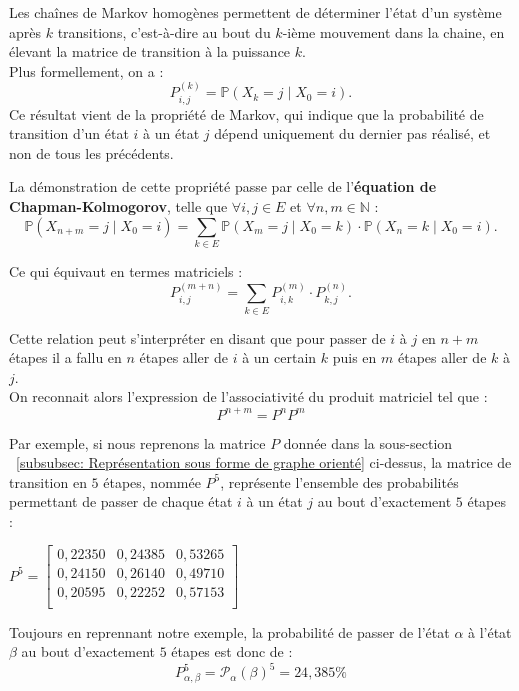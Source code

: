 \documentclass{article}
\begin{document}
Les chaînes de Markov homogènes permettent de déterminer l'état d'un système après $k$ transitions, c'est-à-dire au bout du $k$-ième mouvement dans la chaine, en élevant la matrice de transition à la puissance $k$. \\
Plus formellement, on a :
\[
P_{i,j}^{(k)} = \mathbb{P}(X_k = j \mid X_0 = i).
\]
Ce résultat vient de la propriété de Markov, qui indique que la probabilité de transition d'un état $i$ à un état $j$ dépend uniquement du dernier pas réalisé, et non de tous les précédents.

\begin{tcolorbox}[colback=white,colframe=green!80!black,title=Démonstration]
La démonstration de cette propriété passe par celle de l'\textbf{équation de Chapman-Kolmogorov}, telle que $\forall i,j \in E$ et $\forall n,m \in \mathbb{N}$ :
\[
\mathbb{P}(X_{n+m} = j \mid X_0 = i) = \sum_{k \in E} \mathbb{P}(X_{m} = j \mid X_0 = k) \cdot \mathbb{P}(X_n = k \mid X_0 = i).
\]

Ce qui équivaut en termes matriciels :
\[
P_{i,j}^{(m+n)} = \sum_{k \in E} P_{i,k}^{(m)} \cdot P_{k,j}^{(n)}.
\]

Cette relation peut s'interpréter en disant que pour passer de $i$ à $j$ en $n+m$ étapes il a fallu en $n$ étapes aller de $i$ à un certain $k$ puis en $m$ étapes aller de $k$ à $j$. \\

On reconnait alors l'expression de l'associativité du produit matriciel tel que :
\[
P^{n+m} = P^{n}P^{m}
\]

\end{tcolorbox}

Par exemple, si nous reprenons la matrice $P$ donnée dans la sous-section ~\ref{subsubsec: Représentation sous forme de graphe orienté} ci-dessus, la matrice de transition en $5$ étapes, nommée $P^{5}$, représente l'ensemble des probabilités permettant de passer de chaque état $i$ à un état $j$ au bout d'exactement $5$ étapes :
\begin{center}
$
P^{5} = \begin{bmatrix}
0,22350 & 0,24385 & 0,53265 \\
0,24150 & 0,26140 & 0,49710 \\
0,20595 & 0,22252 & 0,57153 \\
\end{bmatrix}
$
\end{center}
Toujours en reprennant notre exemple, la probabilité de passer de l'état $\alpha$ à l'état $\beta$ au bout d'exactement $5$ étapes est donc de :
\[
P_{\alpha,\beta}^{5} = \mathcal{P}_\alpha(\beta)^{5} = 24,385\%
\]
\end{document}
